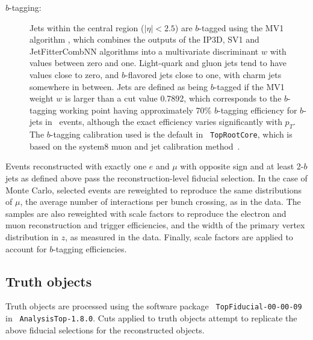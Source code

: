 \begin{description}
\item[$b$-tagging:] Jets within the central region ($|\eta| < 2.5$) are $b$-tagged using the MV1 algorithm 
\cite{btagcom,btagptrel},
which combines the outputs of the IP3D, SV1 and JetFitterCombNN algorithms
into a multivariate discriminant $w$ with values between zero and one. 
Light-quark and gluon jets tend to have values close to zero, and 
$b$-flavored jets close to one, with charm jets somewhere in between. Jets are defined as being $b$-tagged if the MV1 weight $w$ is larger than a cut value 0.7892, which corresponds to the $b$-tagging working 
point having approximately 70\% $b$-tagging efficiency for $b$-jets in \ttbar\ events, although the exact efficiency varies significantly with $p_T$. The $b$-tagging calibration used is the default in \texttt{ TopRootCore}, which is based on the system8 muon and jet calibration method~\cite{btagsys8}.
\end{description}
Events reconstructed with exactly one $e$ and $\mu$ with opposite sign and at least 2-$b$ jets as defined above pass the reconstruction-level fiducial selection. In the case of Monte Carlo, selected events are reweighted to reproduce the same distributions of $\mu$, the average number of interactions per bunch crossing, as in the data. The samples are also reweighted with scale factors to reproduce the electron and muon reconstruction and trigger efficiencies, and the width of the primary vertex distribution in $z$, as measured in the data. Finally, scale factors are applied to account for $b$-tagging efficiencies.
\subsection{Truth objects}
Truth objects are processed using the software package \texttt{ TopFiducial-00-00-09} in \texttt{ AnalysisTop-1.8.0}. Cuts applied to truth objects attempt to replicate the above fiducial selections for the reconstructed objects.

